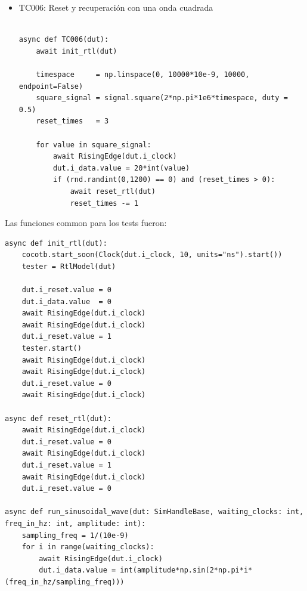 \begin{itemize}
    \item TC006: Reset y recuperación con una onda cuadrada
        \begin{verbatim}

async def TC006(dut):
    await init_rtl(dut)

    timespace     = np.linspace(0, 10000*10e-9, 10000, endpoint=False)
    square_signal = signal.square(2*np.pi*1e6*timespace, duty = 0.5)
    reset_times   = 3

    for value in square_signal:
        await RisingEdge(dut.i_clock)
        dut.i_data.value = 20*int(value)
        if (rnd.randint(0,1200) == 0) and (reset_times > 0):
            await reset_rtl(dut)
            reset_times -= 1
        \end{verbatim}
\end{itemize}

Las funciones common para los tests fueron:
\begin{verbatim}
async def init_rtl(dut):
    cocotb.start_soon(Clock(dut.i_clock, 10, units="ns").start())
    tester = RtlModel(dut)

    dut.i_reset.value = 0
    dut.i_data.value  = 0
    await RisingEdge(dut.i_clock)
    await RisingEdge(dut.i_clock)
    dut.i_reset.value = 1
    tester.start()
    await RisingEdge(dut.i_clock)
    await RisingEdge(dut.i_clock)
    dut.i_reset.value = 0
    await RisingEdge(dut.i_clock)

async def reset_rtl(dut):
    await RisingEdge(dut.i_clock)
    dut.i_reset.value = 0
    await RisingEdge(dut.i_clock)
    dut.i_reset.value = 1
    await RisingEdge(dut.i_clock)
    dut.i_reset.value = 0

async def run_sinusoidal_wave(dut: SimHandleBase, waiting_clocks: int, freq_in_hz: int, amplitude: int):
    sampling_freq = 1/(10e-9)
    for i in range(waiting_clocks):
        await RisingEdge(dut.i_clock)
        dut.i_data.value = int(amplitude*np.sin(2*np.pi*i*(freq_in_hz/sampling_freq)))

\end{verbatim}


